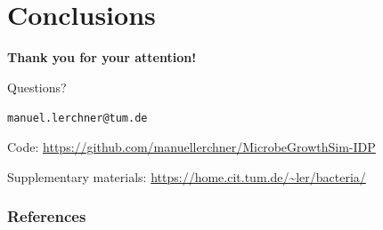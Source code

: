\documentclass[10pt,t]{beamer}
\begin{document}

\section*{Conclusions}

\begin{frame}
    \begin{center}
        \vspace{1cm}
        {\LARGE \textbf{Thank you for your attention!}}

        \vspace{1.5cm}

        \Huge{Questions?}

        \vspace{1.5cm}

        \normalsize
        \texttt{manuel.lerchner@tum.de}

        \vspace{0.3cm}

        \small
        Code: \url{https://github.com/manuellerchner/MicrobeGrowthSim-IDP}

        \vspace{0.2cm}

        Supplementary materials: \url{https://home.cit.tum.de/~ler/bacteria/}
    \end{center}
\end{frame}

\begin{frame}
    \frametitle{References}
    \scriptsize
    
    
\end{frame}

\appendix
\end{document}
